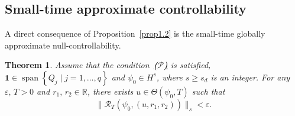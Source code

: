 \documentclass[review]{elsarticle}
\newtheorem{theorem}{Theorem}[section]
\theoremstyle{dotless}
\def\R {\mathbb{R}}
\def \geq{\geqslant}
\numberwithin{equation}{section}
\begin{document}
\subsection{Small-time approximate controllability}
A direct consequence of Proposition~\ref{prop1.2} is the small-time globally approximate null-controllability.
\begin{theorem}\label{thm00}
Assume that the condition~{\hyperlink{H1}{\textbf{($\mathscr{P}$)}}} is satisfied, $ \mathbf{1}\in \operatorname{span}\left\{Q_j\mid j=1, \ldots, q\right\} $ and $\psi_0 \in H^s$, where $s \geq s_d$ is an integer. For any $\varepsilon,\, T>0$ and $r_1,\, r_2\in\R$, there exists $u\in \Theta\left(\psi_0, T\right) $ such that 
\begin{equation*}
\|\mathcal{R}_T \left(\psi_0, (u,r_1,r_2)\right)\|_s< \varepsilon.
\end{equation*}
\end{theorem}
\end{document}

